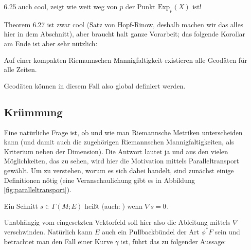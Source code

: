 6.25 auch cool, zeigt wie weit weg von $p$ der Punkt $\text{Exp}_p(X)$ ist!


Theorem 6.27 ist zwar cool (Satz von Hopf-Rinow, deshalb machen wir das alles hier in dem Abschnitt), aber braucht halt ganze Vorarbeit; das folgende Korollar am Ende ist aber sehr nützlich:



\begin{cor}
Auf einer kompakten Riemannschen Mannigfaltigkeit existieren alle Geodäten für alle Zeiten.
\end{cor}
Geodäten können in diesem Fall also global definiert werden.



		\subsection{Krümmung}
Eine natürliche Frage ist, ob und wie man Riemannsche Metriken unterscheiden kann (und damit auch die zugehörigen Riemannschen Mannigfaltigkeiten, als Kriterium neben der Dimension). Die Antwort lautet ja und aus den vielen Möglichkeiten, das zu sehen, wird hier die Motivation mittels Paralleltransport gewählt. Um zu verstehen, worum es sich dabei handelt, sind zunächst einige Definitionen nötig (eine Veranschaulichung gibt es in Abbildung \ref{fig:paralleltransport}).

\begin{defi}
Ein Schnitt $s \in \Gamma(M; E)$ heißt  (auch: ) wenn $\nabla s = 0$.
\end{defi}

Unabhängig vom eingesetzten Vektorfeld soll hier also die Ableitung mittels $\nabla$ verschwinden. Natürlich kann $E$ auch ein Pullbackbündel der Art $\phi^* F$ sein und betrachtet man den Fall einer Kurve $\gamma$ ist, führt das zu folgender Aussage:

\iffalse %
\begin{bsp}

paralleler Schnitt für Linearen Zusammenhang ist Vektorfeld $\nabla_Y X = 0 \in \Gamma(M; T^*M \otimes TM)$ für ein beliebiges $Y \in \mathcal{X}(M)$, man schreibt oft auch einfach $\nabla X = 0$ in diesem Fall

paralleler Schnitt für Zusammenhang auf $E = TM^*$ ist 1-Form $\nabla_Y \omega = 0 \in \Gamma(M; TM \otimes T^*M)$ für ein beliebiges $Y \in \mathcal{X}(M)$


für Vektorfelder heißt das: $X$ ändert sich nicht wenn wir uns die Werte entlang eines Vektorfeldes $Y$ angucken, das nennt man dann parallel; allgemeiner, z.B.~eben für 1-Formen, ist da das Wort konstant vermutlich passender
\end{bsp}
\fi

